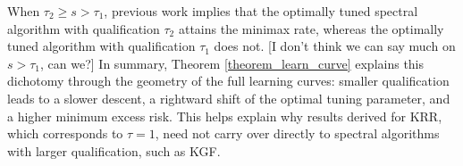 \documentclass{article}
\theoremstyle{plain}
\theoremstyle{definition}
\theoremstyle{remark}
\newtheorem{remark}[theorem]{Remark}
\newcommand{\dhnote}[1]{{\color{red}[#1]} } %
\begin{document}
{%

When $\tau_2 \geq s > \tau_1$, previous work implies that the optimally tuned spectral algorithm with qualification $\tau_2$ attains the minimax rate, whereas the optimally tuned algorithm with qualification $\tau_1$ does not.
\dhnote{I don't think we can say much on $s>\tau_1$, can we?}
In summary, Theorem \ref{theorem_learn_curve} explains this dichotomy through the geometry of the full learning curves: smaller qualification leads to a slower descent, a rightward shift of the optimal tuning parameter, and a higher minimum excess risk. 
This helps explain why results derived for KRR, which corresponds to $\tau=1$, need not carry over directly to spectral algorithms with larger qualification, such as KGF.
}

\fi 

\end{document}
